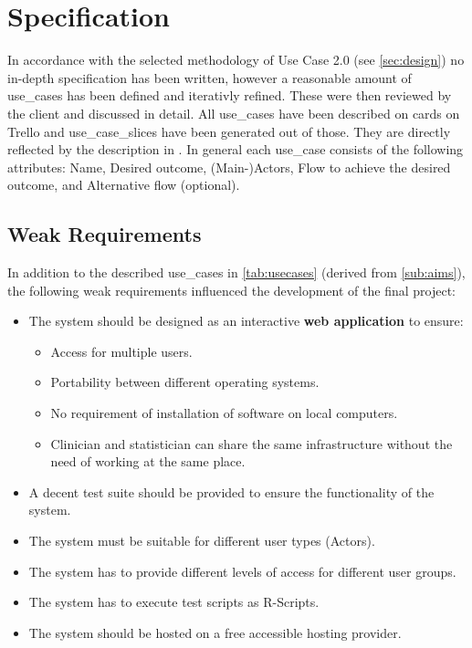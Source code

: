 \section{Specification}
\label{sec:specification}

In accordance with the selected methodology of Use Case 2.0 (see \autoref{sec:design}) no in-depth specification has been written, however a reasonable amount of \glspl{use_case} has been defined and iterativly refined. These were then reviewed by the client and discussed in detail. All \glspl{use_case} have been described on cards on Trello and \glspl{use_case_slice} have been generated out of those. They are directly reflected by the description in \cite{sassoon2016,sassoon2014, sassoon2016CD}. In general each \gls{use_case} consists of the following attributes: Name, Desired outcome, (Main-)\Glspl{Actor}, Flow to achieve the desired outcome, and Alternative flow (optional).


\subsection{Weak Requirements}
\label{sub:weak}
In addition to the described \glspl{use_case} in \autoref{tab:usecases} (derived from \autoref{sub:aims}), the following weak requirements influenced the development of the final project:


\begin{itemize}
	\item The system should be designed as an interactive \textbf{web application} to ensure:
	\begin{itemize}
		\item Access for multiple users.
		\item Portability between different operating systems.
		\item No requirement of installation of software on local computers.
		\item Clinician and statistician can share the same infrastructure without the need of working at the same place.
	\end{itemize}
	\item A decent test suite should be provided to ensure the functionality of the system.
	\item The system must be suitable for different user types (\glspl{Actor}).
	\item The system has to provide different levels of access for different user groups.
	\item The system has to execute test scripts as \gls{R}-Scripts.
	\item The system should be hosted on a free accessible hosting provider.
\end{itemize}


